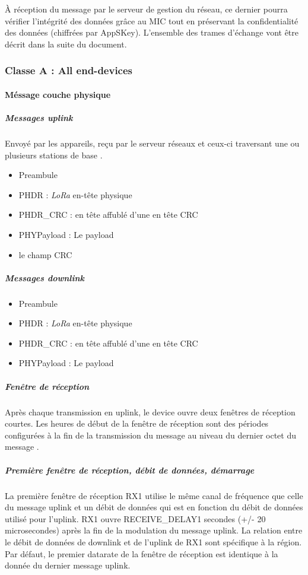 \documentclass[11pt]{article}
\begin{document}
À réception du message par le serveur de gestion du réseau, ce dernier pourra vérifier l’intégrité des données grâce au MIC tout en préservant la confidentialité des données (chiffrées par AppSKey).
L'ensemble des trames d'échange vont être décrit dans la suite du document.




\newpage
\subsubsection{Classe A : All end-devices}
\paragraph{Méssage couche physique }
\subparagraph{Messages uplink}
Envoyé par les appareils, reçu par le serveur réseaux et ceux-ci traversant une ou plusieurs stations de base .

\begin{itemize}
\item  Preambule
\item  PHDR : \textit{LoRa} en-tête physique 
\item  PHDR\_CRC : en tête affublé d'une en tête CRC
\item  PHYPayload : Le payload
\item  le champ CRC
\end{itemize}
\subparagraph{Messages downlink}

\begin{itemize}
\item  Preambule
\item  PHDR : \textit{LoRa} en-tête physique 
\item  PHDR\_CRC : en tête affublé d'une en tête CRC
\item  PHYPayload : Le payload
\end{itemize}
\subparagraph{Fenêtre de réception}

Après chaque transmission en uplink, le device ouvre deux fenêtres de réception courtes. Les heures de début de la fenêtre de réception sont des périodes configurées à la fin de la transmission du message au niveau du dernier octet du message .

\subparagraph{Première fenêtre de réception, débit de données, démarrage}

La première fenêtre de réception RX1 utilise le même canal de fréquence que celle du message uplink et un débit de données qui est en fonction du débit de données utilisé pour l'uplink.
RX1 ouvre RECEIVE\_DELAY1 secondes (+/- 20 microsecondes) après la fin de la modulation du message uplink. La relation entre le débit de données de downlink et de l'uplink de RX1 sont spécifique à la région. Par défaut, le premier datarate de la fenêtre de réception est identique à la donnée du dernier message uplink.
\end{document}
